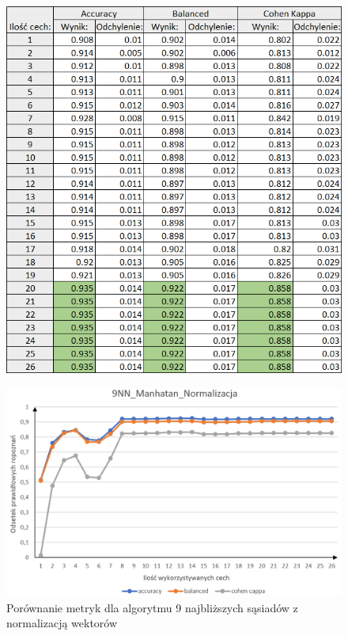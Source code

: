 \documentclass[12pt]{article}
\begin{document}
\begin{figure}[H]
	\centering
		\includegraphics[scale=0.9]{images/metrics/9nn_manhatan_beznorm_tab.png}
	
\end{figure}
\begin{figure}[H]
	\centering
		\includegraphics[scale=0.66]{images/metrics/9nn_manhatan_norm.png}
	\caption{Porównanie metryk dla algorytmu 9 najbliższych sąsiadów z normalizacją wektorów}
\end{figure}
\end{document}
